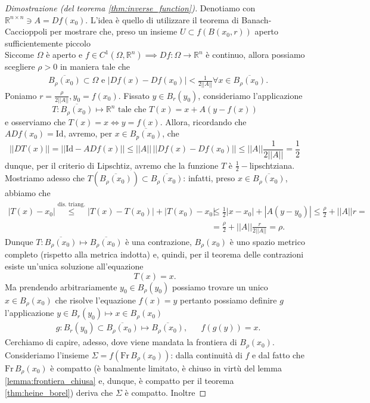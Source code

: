 \begin{proof}[Dimostrazione (del teorema \ref{thm:inverse_function})]
	Denotiamo con $\mathbb{R}^{n \times n} \ni A = Df(x_0)$. L'idea è quello di utilizzare il teorema di Banach-Caccioppoli per mostrare che, preso un insieme $U \subset f(B(x_0, r))$ aperto sufficientemente piccolo\\
	Siccome $\Omega$ è aperto e $f \in C^1(\Omega, \mathbb{R}^n) \implies Df: \Omega \to \mathbb{R}^n$ è continuo, allora possiamo scegliere $\rho > 0$ in maniera tale che
	\begin{align*}
	&\overline{B_{\rho}(x_0)} \subset \Omega \text{    e    } |Df(x) - Df(x_0)| < \frac{1}{2 || A ||} \forall x \in \overline{B_\rho(x_0)}.
	\end{align*}
	Poniamo $r = \frac{\rho}{2 || A ||}, y_0 = f(x_0)$. Fissato $y \in B_r(y_0)$, consideriamo l'applicazione
	$$
	T : \overline{B_{\rho}(x_0)} \mapsto \mathbb{R}^n \text{ tale che } 	T(x) = x + A(y-f(x))
	$$
	e osserviamo che $T(x) = x \iff y=f(x)$. Allora, ricordando che $ADf(x_0) = \text{Id}$, avremo, per $x \in \overline{B_p(x_0)}$, che
	$$
	|| DT(x) || = || \text{Id} - ADf(x) ||  \leq || A || \, || Df(x) - Df(x_0) || \leq || A || \frac{1}{2 || A ||} = \frac{1}{2}
	$$
	dunque, per il criterio di Lipschtiz, avremo che la funzione $T$ è $\frac{1}{2}-$lipschtziana. Mostriamo adesso che $T(\overline{B_\rho(x_0)}) \subset \overline{B_\rho(x_0)}$: infatti, preso $x \in \overline{B_\rho(x_0)}$, abbiamo che
	\begin{align*}
	|T(x) - x_0| \stackrel{\text{dis. triang.}}{\leq} |T(x) - T(x_0)| + |T(x_0) - x_0| &\leq \frac{1}{2} |x-x_0| + |A(y - y_0)| \leq \frac{\rho}{2} + || A || r = \\
	&=\frac{\rho}{2} + || A || \frac{r}{2 || A ||} = \rho.
	\end{align*}
	Dunque $T : \overline{B_\rho(x_0)} \mapsto \overline{B_\rho(x_0)}$ è una contrazione, $B_\rho(x_0)$ è uno spazio metrico completo (rispetto alla metrica indotta) e, quindi, per il teorema delle contrazioni esiste un'unica soluzione all'equazione
	$$
		T(x) = x.
	$$
	Ma prendendo arbitrariamente $y_0 \in B_\rho(y_0)$ possiamo trovare un unico $x \in B_\rho(x_0)$ che risolve l'equazione $f(x) = y$
	pertanto possiamo definire $g$ l'applicazione $y \in B_{r}(y_0) \mapsto x \in B_{\rho}(x_0)$
	\begin{align*}
		&g: B_{r}(y_0) \subset \overline{B_{\rho} (x_0)} \mapsto \overline{B_\rho(x_0)}, & &f(g(y)) = x.
    \end{align*}
	Cerchiamo di capire, adesso, dove viene mandata la frontiera di $B_\rho(x_0)$. Consideriamo l'insieme $\Sigma = f(\text{Fr} \, B_\rho(x_0))$: dalla continuità di $f$ e dal fatto che $\text{Fr} \, B_\rho(x_0)$ è compatto (è banalmente limitato, è chiuso in virtù del lemma \ref{lemma:frontiera_chiusa} e, dunque, è compatto per il teorema \ref{thm:heine_borel}) deriva che $\Sigma$ è compatto. Inoltre

\end{proof}

